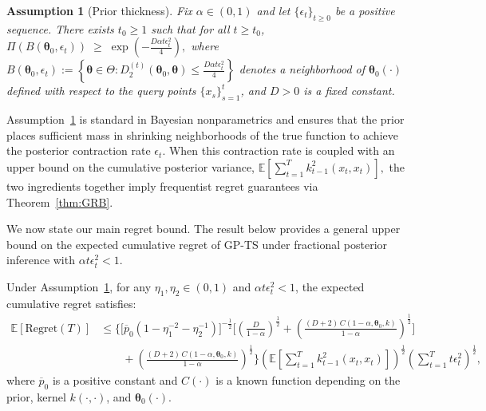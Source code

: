 \documentclass[final,12pt]{colt2026} %
\newtheorem{assumption}[assumption]{Assumption}
\newtheorem{assumption}[theorem]{Assumption}
\begin{document}
\begin{assumption}[Prior thickness]\label{ass:prior}
Fix $\alpha \in (0,1)$ and let $\{\epsilon_t\}_{t\geq 0}$ be a positive sequence. There exists $t_0 \geq 1$ such that for all $t \geq t_0$, 
\(
\Pi\!\left( B(\pmb\theta_0, \epsilon_t) \right)
\;\geq\;
\exp\!\left(-\frac{D \alpha t \epsilon_t^2}{4}\right),
\)
where
\(
B(\pmb\theta_0, \epsilon_t)
:=
\left\{
\pmb\theta \in \Theta :
D_2^{(t)}(\pmb\theta_0, \pmb\theta)
\leq \frac{D \alpha t \epsilon_t^2}{4}
\right\}
\)
denotes a neighborhood of $\pmb\theta_0(\cdot)$ defined with respect to the query points $\{x_s\}_{s=1}^t$, and $D>0$ is a fixed constant.
\end{assumption}

Assumption~\ref{ass:prior} is standard in Bayesian nonparametrics and ensures that the prior places sufficient mass in shrinking neighborhoods of the true function to achieve the posterior contraction rate $\epsilon_t$. When this contraction rate is coupled with an upper bound on the cumulative posterior variance,
\(\mathbb{E}\!\left[\sum_{t=1}^{T} k_{t-1}^2(x_t,x_t)\right], \)
the two ingredients together imply frequentist regret guarantees via Theorem~\ref{thm:GRB}. 

We now state our main regret bound. The result below provides a general upper bound on the expected cumulative regret of GP-TS under fractional posterior inference with $\alpha t\epsilon_t^2 <1$.

\begin{theorem}\label{thm:GRB}
Under Assumption~\ref{ass:prior}, for any $\eta_1, \eta_2 \in (0,1)$ and $\alpha t\epsilon_t^2 <1$, the expected cumulative regret satisfies:
\begin{align}
\label{eq:regret-bound-final-alpha-theorem}
\mathbb{E}[\mathrm{Regret}(T)]
&\leq
\Bigg\{
\big[\overline{p}_0(1-\eta_1^{-2}-\eta_2^{-1})\big]^{-\frac{1}{2}}
\Bigg[
\left(\frac{D}{1-\alpha}\right)^{\frac{1}{2}}
+
\left(\frac{(D+2)\,C(1-\alpha,\pmb\theta_0,k)}{1-\alpha}\right)^{\frac{1}{2}}
\Bigg] \nonumber\\
&\quad\quad
+
\left(\frac{(D+2)\,C(1-\alpha,\pmb\theta_0,k)}{1-\alpha}\right)^{\frac{1}{2}}
\Bigg\}
\left(
\mathbb{E}\!\left[\sum_{t=1}^T k_{t-1}^2(x_t,x_t)\right]
\right)^{\frac{1}{2}}
\left(
\sum_{t=1}^T t \epsilon_t^2
\right)^{\frac{1}{2}},
\end{align}
where $\overline{p}_0$ is a positive constant and $C(\cdot)$ is a known function depending on the prior, kernel $k(\cdot, \cdot)$, and $\pmb\theta_0(\cdot)$.
\end{theorem}
\end{document}
